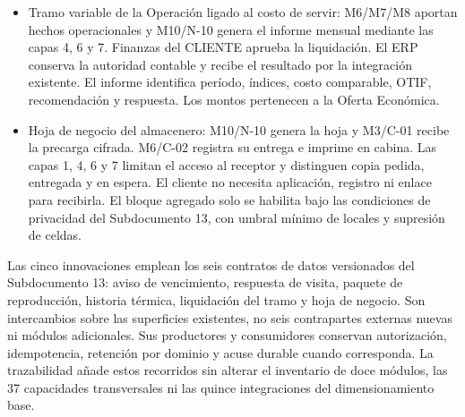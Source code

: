 \begin{itemize}
\item Tramo variable de la Operación ligado al costo de servir: M6/M7/M8 aportan hechos operacionales y M10/N-10 genera el informe mensual mediante las capas 4, 6 y 7. Finanzas del CLIENTE aprueba la liquidación. El ERP conserva la autoridad contable y recibe el resultado por la integración existente. El informe identifica período, índices, costo comparable, OTIF, recomendación y respuesta. Los montos pertenecen a la Oferta Económica.
\item Hoja de negocio del almacenero: M10/N-10 genera la hoja y M3/C-01 recibe la precarga cifrada. M6/C-02 registra su entrega e imprime en cabina. Las capas 1, 4, 6 y 7 limitan el acceso al receptor y distinguen copia pedida, entregada y en espera. El cliente no necesita aplicación, registro ni enlace para recibirla. El bloque agregado solo se habilita bajo las condiciones de privacidad del Subdocumento 13, con umbral mínimo de locales y supresión de celdas.
\end{itemize}

Las cinco innovaciones emplean los seis contratos de datos versionados del Subdocumento 13: aviso de vencimiento, respuesta de visita, paquete de reproducción, historia térmica, liquidación del tramo y hoja de negocio. Son intercambios sobre las superficies existentes, no seis contrapartes externas nuevas ni módulos adicionales. Sus productores y consumidores conservan autorización, idempotencia, retención por dominio y acuse durable cuando corresponda. La trazabilidad añade estos recorridos sin alterar el inventario de doce módulos, las 37 capacidades transversales ni las quince integraciones del dimensionamiento base.

